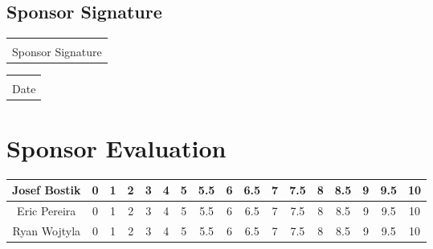 \documentclass[12pt]{article}
\makeatletter
\newcommand{\titledate}[2][2.5in]{%
	\noindent%
	\begin{tabular}{@{}p{#1}@{}}
		\\ \hline \\[-.75\normalbaselineskip]
		#2
	\end{tabular} \hspace{1in}
	\begin{tabular}{@{}p{#1}@{}}
		\\ \hline \\[-.75\normalbaselineskip]
		Date
	\end{tabular}
}
\makeatother
\begin{document}
\vspace{1in}

\newpage

\subsection{Sponsor Signature}
\vspace{.5in}
 \titledate{Sponsor Signature}
 
\section{Sponsor Evaluation}
\begin{tabular}{|c|c|c|c|c|c|c|c|c|c|c|c|c|c|c|c|c|}
	\hline
	Josef Bostik & 0 & 1 & 2 & 3 & 4 & 5 & 5.5 & 6 & 6.5 & 7 & 7.5 & 8 & 8.5 & 9 & 9.5 & 10\\
	\hline
	Eric Pereira & 0 & 1 & 2 & 3 & 4 & 5 & 5.5 & 6 & 6.5 & 7 & 7.5 & 8 & 8.5 & 9 & 9.5 & 10\\
	\hline
	Ryan Wojtyla & 0 & 1 & 2 & 3 & 4 & 5 & 5.5 & 6 & 6.5 & 7 & 7.5 & 8 & 8.5 & 9 & 9.5 & 10\\
	\hline
\end{tabular}
\end{document}
